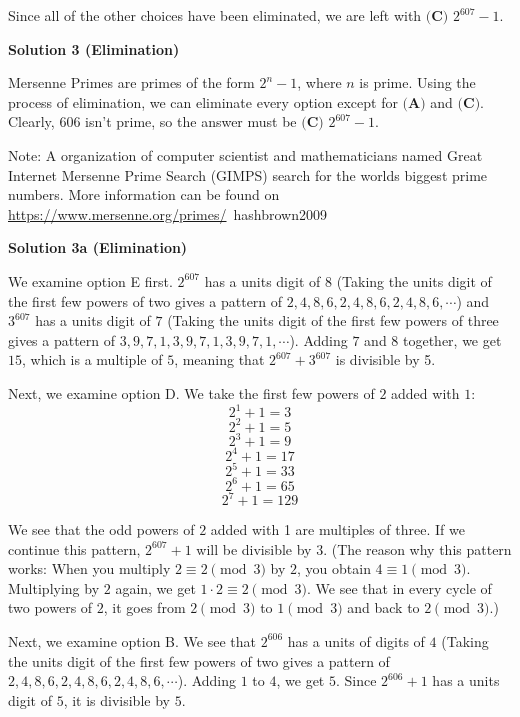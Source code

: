 \begin{enumerate}
 Since all of the other choices have been eliminated, we are left with $\boxed{\textbf{(C) } 2^{607}-1}$.

 



\textbf{Solution 3 (Elimination)}

Mersenne Primes are primes of the form $2^n-1$, where $n$ is prime. Using the process of elimination, we can eliminate every option except for $\textbf{(A)}$ and $\textbf{(C)}$. Clearly, $606$ isn't prime, so the answer must be $\boxed{\textbf{(C) }2^{607}-1}$.

 Note: A organization of computer scientist and mathematicians named Great Internet Mersenne Prime Search (GIMPS) search for the worlds biggest prime numbers. More information can be found on \href{https://www.mersenne.org/primes/}{https://www.mersenne.org/primes/}~hashbrown2009

 



\textbf{Solution 3a (Elimination)}

We examine option E first. $2^{607}$ has a units digit of $8$ (Taking the units digit of the first few powers of two gives a pattern of $2, 4, 8, 6, 2, 4, 8, 6, 2, 4, 8, 6,\cdots$) and $3^{607}$ has a units digit of $7$ (Taking the units digit of the first few powers of three gives a pattern of $3, 9, 7, 1, 3, 9, 7, 1, 3, 9, 7, 1,\cdots$). Adding $7$ and $8$ together, we get $15$, which is a multiple of $5$, meaning that $2^{607}+3^{607}$ is divisible by 5.

 Next, we examine option D. We take the first few powers of $2$ added with $1$:
 \[2^1+1=3\]
 \[2^2+1=5\]
 \[2^3+1=9\]
 \[2^4+1=17\]
 \[2^5+1=33\]
 \[2^6+1=65\]
 \[2^7+1=129\]

 We see that the odd powers of $2$ added with 1 are multiples of three. If we continue this pattern, $2^{607}+1$ will be divisible by $3$. (The reason why this pattern works: When you multiply $2 \equiv2\pmod{3}$ by $2$, you obtain $4 \equiv1 \pmod{3}$. Multiplying by $2$ again, we get $1\cdot2\equiv2 \pmod{3}$. We see that in every cycle of two powers of $2$, it goes from $2 \pmod{3}$ to $1 \pmod{3}$ and back to $2 \pmod{3}$.)

 Next, we examine option B. We see that $2^{606}$ has a units of digits of $4$ (Taking the units digit of the first few powers of two gives a pattern of $2, 4, 8, 6, 2, 4, 8, 6, 2, 4, 8, 6,\cdots$). Adding $1$ to $4$, we get $5$. Since $2^{606}+1$ has a units digit of $5$, it is divisible by $5$.


\end{enumerate}
